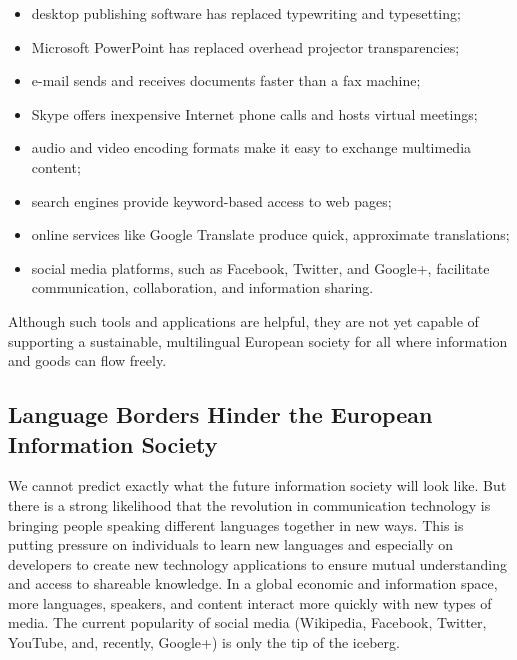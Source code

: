\begin{multicols}{2}
\begin{itemize}
\item  desktop publishing software has replaced typewriting and typesetting;
\item  Microsoft PowerPoint has replaced overhead projector transparencies;
\item  e-mail sends and receives documents faster than a fax machine;
\item  Skype offers inexpensive Internet phone calls and hosts virtual meetings;
\item  audio and video encoding formats make it easy to exchange multimedia content;
\item  search engines provide keyword-based access to web pages;
\item  online services like Google Translate produce quick, approximate translations;
\item  social media platforms, such as Facebook, Twitter, and Google+, facilitate communication, collaboration, and information sharing.
\end{itemize}

Although such tools and applications are helpful, they are not yet capable of supporting a sustainable, multilingual European society for all where information and goods can flow freely.

\subsection[Language Borders Hinder the European Information Society]{Language Borders Hinder the European Information Society}

We cannot predict exactly what the future information society will look like.  But there is a strong likelihood that the revolution in communication technology is bringing people speaking different languages together in new ways.  This is putting pressure on individuals to learn new languages and especially on developers to create new technology applications to ensure mutual understanding and access to shareable knowledge.  In a global economic and information space, more languages, speakers, and content interact more quickly with new types of media.  The current popularity of social media (Wikipedia, Facebook, Twitter, YouTube, and, recently, Google+) is only the tip of the iceberg.



\end{multicols}
